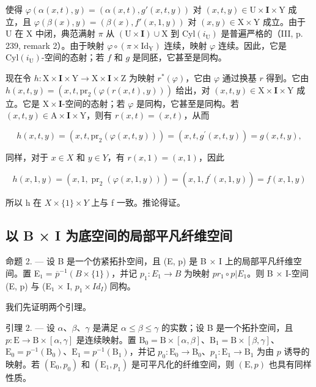 使得 \(\varphi(\alpha(x,t),y) = (\alpha(x,t),g'(x,t,y))\) 对 \((x,t,y) \in \mathrm{U} \times \mathbf{I} \times \mathrm{Y}\) 成立，且 \(\varphi(\beta(x),y) = (\beta(x),f'(x,1,y))\) 对 \((x,y) \in \mathrm{X} \times \mathrm{Y}\) 成立。由于 U 在 X 中闭，典范满射 \(\pi\) 从 \((\mathrm{U} \times \mathbf{I}) \cup \mathrm{X}\) 到 \(\mathrm{Cyl}(i_{\mathrm{U}})\) 是普遍严格的（III, p. 239, remark 2）。由于映射 \(\varphi \circ (\pi \times \mathrm{Id}_{\mathrm{Y}})\) 连续，映射 \(\varphi\) 连续。因此，它是 \(\mathrm{Cyl}(i_{\mathrm{U}})\)-空间的态射；若 \(f\) 和 \(g\) 是同胚，它甚至是同构。

现在令 \(h \colon \mathrm{X} \times \mathbf{I} \times \mathrm{Y} \to \mathrm{X} \times \mathbf{I} \times \mathrm{Z}\) 为映射 \(r^*(\varphi)\)，它由 \(\varphi\) 通过换基 \(r\) 得到。它由 \(h(x,t,y) = (x,t,\mathrm{pr}_2(\varphi(r(x,t),y)))\) 给出，对 \((x,t,y) \in \mathrm{X} \times \mathbf{I} \times \mathrm{Y}\) 成立。它是 \(\mathrm{X} \times \mathbf{I}\)-空间的态射；若 \(\varphi\) 是同构，它甚至是同构。若 \((x,t,y) \in \mathrm{A} \times \mathbf{I} \times \mathrm{Y}\)，则有 \(r(x,t) = (x,t)\)，从而

\[
h (x, t, y) = (x, t, \mathrm{pr} _ {2} (\varphi (x, t, y))) = (x, t, g ^ {\prime} (x, t, y)) = g (x, t, y),
\]

同样，对于 \(x \in X\) 和 \(y \in Y\)，有 \(r(x,1) = (x,1)\)，因此

\[
h (x, 1, y) = (x, 1, \operatorname{pr} _ {2} (\varphi (x, 1, y))) = (x, 1, f ^ {\prime} (x, 1, y)) = f (x, 1, y)
\]

所以 h 在 \(X \times \{1\} \times Y\) 上与 f 一致。推论得证。

\subsection{以 B × I 为底空间的局部平凡纤维空间}

命题 2. --- 设 B 是一个仿紧拓扑空间，且 (E, p) 是 B × I 上的局部平凡纤维空间。置 E₁ = \(\overline{p}^{-1}(B \times \{1\})\)，并记 \(p_{1}: E_{1} \to B\) 为映射 \(pr_{1} \circ p | E_{1}\)。则 B × I-空间 (E, p) 与 (E₁ × I, \(p_{1} \times Id_{I}\)) 同构。

我们先证明两个引理。

引理 2. --- 设 \(\alpha\)、\(\beta\)、\(\gamma\) 是满足 \(\alpha \leqslant \beta \leqslant \gamma\) 的实数；设 B 是一个拓扑空间，且 \(p: \mathrm{E} \to \mathrm{B} \times [\alpha, \gamma]\) 是连续映射。置 \(\mathrm{B}_0 = \mathrm{B} \times [\alpha, \beta]\)、\(\mathrm{B}_1 = \mathrm{B} \times [\beta, \gamma]\)、\(\mathrm{E}_0 = p^{-1}(\mathrm{B}_0)\)、\(\mathrm{E}_1 = p^{-1}(\mathrm{B}_1)\)，并记 \(p_0: \mathrm{E}_0 \to \mathrm{B}_0\)、\(p_1: \mathrm{E}_1 \to \mathrm{B}_1\) 为由 \(p\) 诱导的映射。若 \((\mathrm{E}_0, p_0)\) 和 \((\mathrm{E}_1, p_1)\) 是可平凡化的纤维空间，则 \((\mathrm{E}, p)\) 也具有同样性质。

